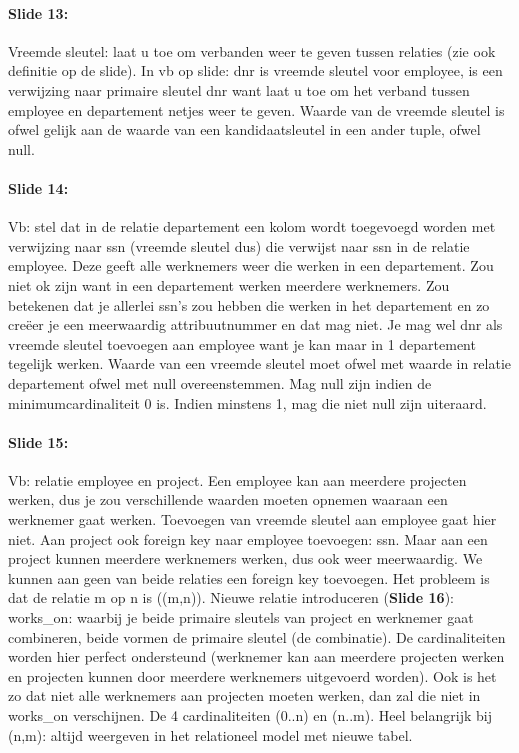 \documentclass[10pt,a4paper]{report}
\begin{document}
\paragraph{Slide 13:}Vreemde sleutel: laat u toe om verbanden weer te geven tussen relaties (zie ook definitie op de slide). In vb op slide: dnr is vreemde sleutel voor employee, is een verwijzing naar primaire sleutel dnr want laat u toe om het verband tussen employee en departement netjes weer te geven. Waarde van de vreemde sleutel is ofwel gelijk aan de waarde van een kandidaatsleutel in een ander tuple, ofwel null. 

\paragraph{Slide 14:}Vb: stel dat in de relatie departement een kolom wordt toegevoegd worden met verwijzing naar ssn (vreemde sleutel dus) die verwijst naar ssn in de relatie employee. Deze geeft alle werknemers weer die werken in een departement. Zou niet ok zijn want in een departement werken meerdere werknemers. Zou betekenen dat je allerlei ssn's zou hebben die werken in het departement en zo creëer je een meerwaardig attribuutnummer en dat mag niet. Je mag wel dnr als vreemde sleutel toevoegen aan employee want je kan maar in 1 departement tegelijk werken. Waarde van een vreemde sleutel moet ofwel met waarde in relatie departement ofwel met null overeenstemmen. Mag null zijn indien de minimumcardinaliteit 0 is. Indien minstens 1, mag die niet null zijn uiteraard.

\paragraph{Slide 15:}Vb: relatie employee en project. Een employee kan aan meerdere projecten werken, dus je zou verschillende waarden moeten opnemen waaraan een werknemer gaat werken. Toevoegen van vreemde sleutel aan employee gaat hier niet. Aan project ook foreign key naar employee toevoegen: ssn. Maar aan een project kunnen meerdere werknemers werken, dus ook weer meerwaardig. We kunnen aan geen van beide relaties een foreign key toevoegen. Het probleem is dat de relatie m op n is ((m,n)). Nieuwe relatie introduceren (\textbf{Slide 16}): works\_on: waarbij je beide primaire sleutels van project en werknemer gaat combineren, beide vormen de primaire sleutel (de combinatie). De cardinaliteiten worden hier perfect ondersteund (werknemer kan aan meerdere projecten werken en projecten kunnen door meerdere werknemers uitgevoerd worden). Ook is het zo dat niet alle werknemers aan projecten moeten werken, dan zal die niet in works\_on verschijnen. De 4 cardinaliteiten (0..n) en (n..m). Heel belangrijk bij (n,m): altijd weergeven in het relationeel model met nieuwe tabel.
\end{document}
